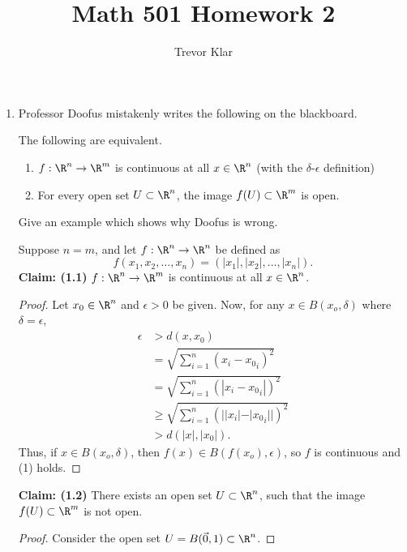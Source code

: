 \documentclass[letterpaper]{article}
\title{Math 501 \linebreak
Homework 2}
\author{Trevor Klar}
\begin{document}
\maketitle
\begin{enumerate}
\item Professor Doofus mistakenly writes the following on the blackboard.
\begin{romantheorem*}The following are equivalent.
\begin{enumerate}[label=(\arabic*)]
\item $f:\R^n \to \R^m$ is continuous at all $x \in \R^n$ (with the $\delta$-$\epsilon$ definition)
\item For every open set $U \subset \R^n$, the image $f(U) \subset \R^m$ is open. 
\end{enumerate}
\end{romantheorem*}
Give an example which shows why Doofus is wrong. 
\begin{example*}
Suppose $n=m$, and let $f:\R^n\to\R^n$ be defined as 
$$f(x_1, x_2, \ldots, x_n) = (|x_1|, |x_2|, \ldots, |x_n|).$$ 
\textbf{Claim: (1.1)} $f:\R^n \to \R^m$ is continuous at all $x \in \R^n$.
\begin{proof}
Let $x_0 \in \R^n$ and $\epsilon > 0$ be given. Now, for any $x \in B(x_o, \delta)$ where $\delta = \epsilon$, 
\[
\begin{aligned}%
\epsilon &> d(x,x_0)\\
&= \sqrt{\sum_{i=1}^n (x_i-{x_0}_i)^2}\\
&= \sqrt{\sum_{i=1}^n (|x_i-{x_0}_i|)^2}\\
&\geq \sqrt{\sum_{i=1}^n (||x_i|-|{x_0}_i||)^2}\\
&> d(|x|,|x_0|).
\end{aligned}
\]
Thus, if $x \in B(x_o, \delta)$, then $f(x) \in B(f(x_o), \epsilon)$, so $f$ is continuous and (1) holds. 
\end{proof}

\pagebreak

\textbf{Claim: (1.2)} There exists an open set $U \subset \R^n$, such that the image $f(U) \subset \R^m$ is not open.
\begin{proof}
Consider the open set $U=B(\vec{0},1) \subset \R^n$. 


\end{proof}
\end{example*}
\end{enumerate}
\end{document}
